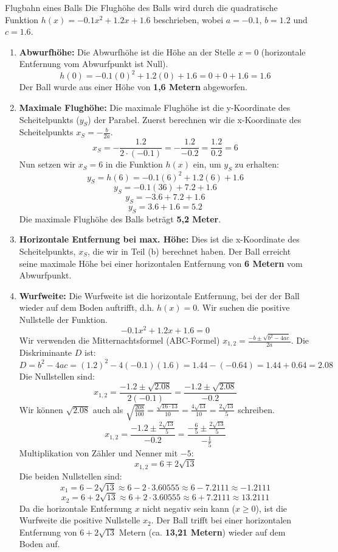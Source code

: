 \begin{loesungsumgebung}{Flugbahn eines Balls}
Die Flughöhe des Balls wird durch die quadratische Funktion $h(x) = -0.1x^2 + 1.2x + 1.6$ beschrieben, wobei $a=-0.1$, $b=1.2$ und $c=1.6$.

\begin{enumerate}[label=(\alph*)]
    \item \textbf{Abwurfhöhe:}
    Die Abwurfhöhe ist die Höhe an der Stelle $x=0$ (horizontale Entfernung vom Abwurfpunkt ist Null).
    $$ h(0) = -0.1(0)^2 + 1.2(0) + 1.6 = 0 + 0 + 1.6 = 1.6 $$
    Der Ball wurde aus einer Höhe von \textbf{1,6 Metern} abgeworfen.

    \item \textbf{Maximale Flughöhe:}
    Die maximale Flughöhe ist die y-Koordinate des Scheitelpunkts ($y_S$) der Parabel. Zuerst berechnen wir die x-Koordinate des Scheitelpunkts $x_S = -\frac{b}{2a}$.
    $$ x_S = -\frac{1.2}{2 \cdot (-0.1)} = -\frac{1.2}{-0.2} = \frac{1.2}{0.2} = 6 $$
    Nun setzen wir $x_S=6$ in die Funktion $h(x)$ ein, um $y_S$ zu erhalten:
    $$ y_S = h(6) = -0.1(6)^2 + 1.2(6) + 1.6 $$
    $$ y_S = -0.1(36) + 7.2 + 1.6 $$
    $$ y_S = -3.6 + 7.2 + 1.6 $$
    $$ y_S = 3.6 + 1.6 = 5.2 $$
    Die maximale Flughöhe des Balls beträgt \textbf{5,2 Meter}.

    \item \textbf{Horizontale Entfernung bei max. Höhe:}
    Dies ist die x-Koordinate des Scheitelpunkts, $x_S$, die wir in Teil (b) berechnet haben.
    Der Ball erreicht seine maximale Höhe bei einer horizontalen Entfernung von \textbf{6 Metern} vom Abwurfpunkt.

    \item \textbf{Wurfweite:}
    Die Wurfweite ist die horizontale Entfernung, bei der der Ball wieder auf dem Boden auftrifft, d.h. $h(x)=0$. Wir suchen die positive Nullstelle der Funktion.
    $$ -0.1x^2 + 1.2x + 1.6 = 0 $$
    Wir verwenden die Mitternachtsformel (ABC-Formel) $x_{1,2} = \frac{-b \pm \sqrt{b^2-4ac}}{2a}$.
    Die Diskriminante $D$ ist:
    $$ D = b^2 - 4ac = (1.2)^2 - 4(-0.1)(1.6) = 1.44 - (-0.64) = 1.44 + 0.64 = 2.08 $$
    Die Nullstellen sind:
    $$ x_{1,2} = \frac{-1.2 \pm \sqrt{2.08}}{2(-0.1)} = \frac{-1.2 \pm \sqrt{2.08}}{-0.2} $$
    Wir können $\sqrt{2.08}$ auch als $\sqrt{\frac{208}{100}} = \frac{\sqrt{16 \cdot 13}}{10} = \frac{4\sqrt{13}}{10} = \frac{2\sqrt{13}}{5}$ schreiben.
    $$ x_{1,2} = \frac{-1.2 \pm \frac{2\sqrt{13}}{5}}{-0.2} = \frac{-\frac{6}{5} \pm \frac{2\sqrt{13}}{5}}{-\frac{1}{5}} $$
    Multiplikation von Zähler und Nenner mit $-5$:
    $$ x_{1,2} = 6 \mp 2\sqrt{13} $$
    Die beiden Nullstellen sind:
    $$ x_1 = 6 - 2\sqrt{13} \approx 6 - 2 \cdot 3.60555 \approx 6 - 7.2111 \approx -1.2111 $$
    $$ x_2 = 6 + 2\sqrt{13} \approx 6 + 2 \cdot 3.60555 \approx 6 + 7.2111 \approx 13.2111 $$
    Da die horizontale Entfernung $x$ nicht negativ sein kann ($x \ge 0$), ist die Wurfweite die positive Nullstelle $x_2$.
    Der Ball trifft bei einer horizontalen Entfernung von $6 + 2\sqrt{13}$ Metern (ca. \textbf{13,21 Metern}) wieder auf dem Boden auf.
\end{enumerate}

\end{loesungsumgebung}


